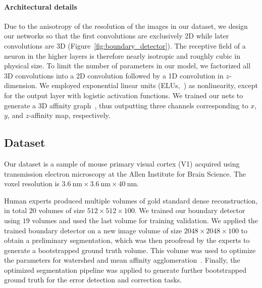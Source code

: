 \paragraph{Architectural details} Due to the anisotropy of the resolution of the
images in our dataset, we design our networks so that the first convolutions
are exclusively 2D while later convolutions are 3D
(Figure~\ref{fig:boundary_detector}). The receptive field of a neuron in the
higher layers is therefore nearly isotropic and roughly cubic in physical size.
To limit the number of parameters in our model, we factorized all 3D
convolutions into a 2D convolution followed by a 1D convolution in
$z$-dimension. We employed exponential linear units (ELUs,~\cite{elu}) as
nonlinearity, except for the output layer with logistic activation functions. We
trained our nets to generate a 3D affinity
graph~\cite{boundary_detection,kisuk,funke2017deep}, thus outputting three
channels corresponding to $x$, $y$, and $z$-affinity map, respectively.

\subsection{Dataset}
Our dataset is a sample of mouse primary visual cortex (V1) acquired using
transmission electron microscopy at the Allen Institute for Brain Science. The
voxel resolution is $3.6~\text{nm} \times 3.6~\text{nm} \times 40~\text{nm}$.

Human experts produced multiple volumes of gold standard dense reconstruction,
in total $20$ volumes of size $512 \times 512 \times 100$. We trained our
boundary detector using $19$ volumes and used the last volume for training
validation. We applied the trained boundary detector on a new image volume of
size $2048 \times 2048 \times 100$ to obtain a preliminary segmentation, which
was then proofread by the experts to generate a bootstrapped ground truth
volume. This volume was used to optimize the parameters for watershed and mean
affinity agglomeration~\cite{kisuk}. Finally, the optimized segmentation
pipeline was applied to generate further bootstrapped ground truth for the error
detection and correction tasks.

